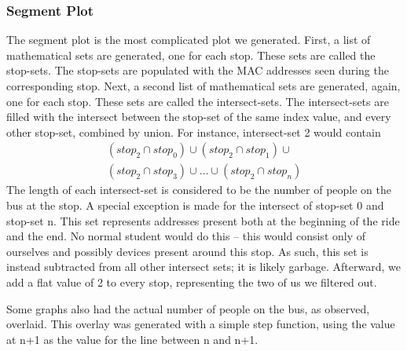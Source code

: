 \subsubsection*{Segment Plot}
The segment plot is the most complicated plot we generated.
First, a list of mathematical sets are generated, one for each stop.
These sets are called the stop-sets.
The stop-sets are populated with the MAC addresses seen during the corresponding stop.
Next, a second list of mathematical sets are generated, again, one for each stop.
These sets are called the intersect-sets.
The intersect-sets are filled with the intersect between the stop-set of the same index value, and every other stop-set, combined by union.
For instance, intersect-set 2 would contain
\begin{multline*}
  \left(stop_2 \cap stop_0\right) \cup \left(stop_2 \cap stop_1\right) \cup \\
  \left(stop_2 \cap stop_3\right) \cup \dots \cup \left(stop_2 \cap stop_n\right)
\end{multline*}
The length of each intersect-set is considered to be the number of people on the bus at the stop.
A special exception is made for the intersect of stop-set 0 and stop-set n.
This set represents addresses present both at the beginning of the ride and the end.
No normal student would do this -- this would consist only of ourselves and possibly devices present around this stop.
As such, this set is instead subtracted from all other intersect sets; it is likely garbage.
Afterward, we add a flat value of 2 to every stop, representing the two of us we filtered out.

Some graphs also had the actual number of people on the bus, as observed, overlaid.
This overlay was generated with a simple step function, using the value at n+1 as the value for the line between n and n+1.
